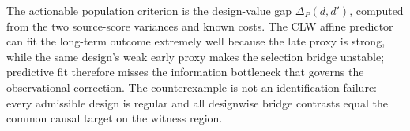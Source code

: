 The actionable population criterion is the design-value gap \(\Delta_P(d,d')\), computed from the two source-score variances and known costs. The CLW affine predictor can fit the long-term outcome extremely well because the late proxy is strong, while the same design's weak early proxy makes the selection bridge unstable; predictive fit therefore misses the information bottleneck that governs the observational correction. The counterexample is not an identification failure: every admissible design is regular and all designwise bridge contrasts equal the common causal target on the witness region.